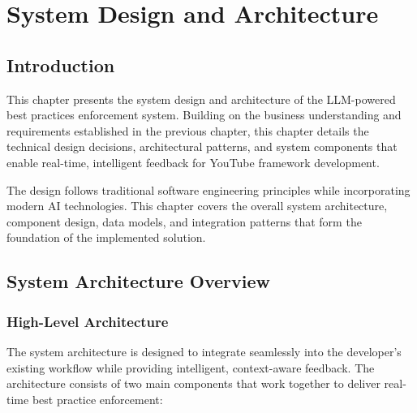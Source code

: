 
\setcounter{chapter}{2}
\chapter{System Design and Architecture}
\minitoc %
\graphicspath{{Chapitre3/figures/}}

\pagestyle{fancy}
\fancyhf{}
\fancyhead[R]{\bfseries\rightmark}
\fancyfoot[R]{\thepage}
\renewcommand{\headrulewidth}{0.5pt}
\renewcommand{\footrulewidth}{0pt}
\renewcommand{\chaptermark}[1]{\markboth{{\chaptername~\thechapter. #1 }}{}}
\renewcommand{\sectionmark}[1]{\markright{\thechapter.\thesection~ #1}}

\begin{spacing}{1.2}

\section*{Introduction}
This chapter presents the system design and architecture of the LLM-powered best practices enforcement system. Building on the business understanding and requirements established in the previous chapter, this chapter details the technical design decisions, architectural patterns, and system components that enable real-time, intelligent feedback for YouTube framework development.

The design follows traditional software engineering principles while incorporating modern AI technologies. This chapter covers the overall system architecture, component design, data models, and integration patterns that form the foundation of the implemented solution.

\section{System Architecture Overview}

\subsection{High-Level Architecture}
The system architecture is designed to integrate seamlessly into the developer's existing workflow while providing intelligent, context-aware feedback. The architecture consists of two main components that work together to deliver real-time best practice enforcement:


\end{spacing}
